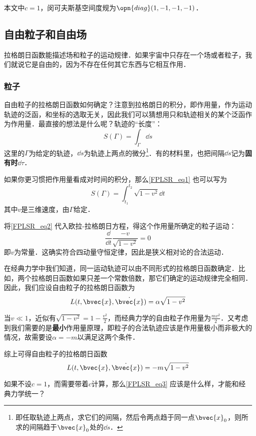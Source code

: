 

本文中$c=1$，闵可夫斯基空间度规为$\opn{diag}(1, -1, -1, -1)$．

\subsection{自由粒子和自由场}

拉格朗日函数能描述场和粒子的运动规律．如果宇宙中只存在一个场或者粒子，我们就说它是自由的，因为不存在任何其它东西与它相互作用．

\subsubsection{粒子}

自由粒子的拉格朗日函数如何确定？注意到拉格朗日的积分，即作用量，作为运动轨迹的泛函，和坐标的选取无关，因此我们可以猜想用只和轨迹相关的某个泛函作为作用量．最直接的想法是什么呢？轨迹的“长度”：
\begin{equation}\label{FPLSR_eq1}
S(\Gamma) = \int_\Gamma \dd s
\end{equation}
这里的$\Gamma$为给定的轨迹，$\dd s$为轨迹上两点的微分\footnote{即任取轨迹上两点，求它们的间隔，然后令两点趋于同一点$\bvec{x}_0$，则所求的间隔趋于$\bvec{x}_0$处的$\dd s$．}．有的材料里，也把间隔$\dd s$记为\textbf{固有时}$\dd \tau$．

如果你更习惯把作用量看成对时间的积分，那么\autoref{FPLSR_eq1} 也可以写为
\begin{equation}\label{FPLSR_eq2}
S(\Gamma) = \int_{t_1}^{t_2} \sqrt{1-v^2} \dd t
\end{equation}
其中$v$是三维速度，由$\Gamma$给定．

将\autoref{FPLSR_eq2} 代入欧拉-拉格朗日方程，得这个作用量所确定的粒子运动：
\begin{equation}
\frac{\dd}{\dd t}\frac{-v}{\sqrt{1-v^2}} = 0
\end{equation}
即$v$为常量．这确实符合四动量守恒定律，因此是狭义相对论的合法运动．

在经典力学中我们知道，同一运动轨迹可以由不同形式的拉格朗日函数确定．比如，两个拉格朗日函数如果只差一个常数倍数，那它们确定的运动规律完全相同．因此，我们应设自由粒子的拉格朗日函数为
\begin{equation}
L(t, \bvec{x}, \dot{\bvec{x}}) = \alpha\sqrt{1-v^2}
\end{equation}

当$v\ll 1$，近似有$\sqrt{1-v^2}=1-\frac{v^2}{2}$，而经典力学的自由粒子作用量为$\frac{mv^2}{2}$．又考虑到我们需要的是\textbf{最小}作用量原理，即粒子的合法轨迹应该是作用量极小而非极大的情况，故需要设$\alpha=-m$以满足这两个条件．

综上可得自由粒子的拉格朗日函数
\begin{equation}\label{FPLSR_eq3}
L(t, \bvec{x}, \dot{\bvec{x}}) = -m\sqrt{1-v^2}
\end{equation}

\begin{exercise}{}
如果不设$c=1$，而需要带着$c$计算，那么\autoref{FPLSR_eq3} 应该是什么样，才能和经典力学统一？
\end{exercise}